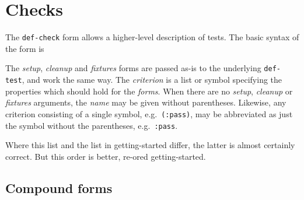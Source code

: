 \section{Checks}
 The
\texttt{def-check}
form allows a higher-level description of tests.  The basic syntax of
the form is
\begin{tabbing}\hspace*{1cm}
\end{tabbing}
The \textit{setup}, \textit{cleanup} and \textit{fixtures} forms are
passed as-is to the underlying \texttt{def-test}, and work the same
way.  The \textit{criterion} is a list or symbol specifying the
properties which should hold for the \textit{forms}.  When there are
no \textit{setup}, \textit{cleanup} or \textit{fixtures} arguments,
the \textit{name} may be given without parentheses.  Likewise, any
criterion consisting of a single symbol, e.g.\ \texttt{(:pass)}, may
be abbreviated as just the symbol without the parentheses, e.g.\
\texttt{:pass}.

 Where this list and the list in getting-started
differ, the latter is almost certainly correct.  But this order is
better, re-ored getting-started.

\def\criteriaGroup#1{\subsection{#1}}
\def\endcriteriaGroup{}
\def\criteriaDoc#1#2#3#4#5#6#7{%
\subsubsection{The \texttt{#2} check} 
#4\index{#1@\texttt{#2}}
\\ Syntax: \texttt{#3}
#6{#7}}
\def\noEx#1{}
\def\singleEx#1{\\Example: \texttt{#1}}
\def\multiEx#1{}
\def\tabbingEx#1{\\Example: \begin{tabbing}#1\end{tabbing}}


\subsection{Compound forms}

